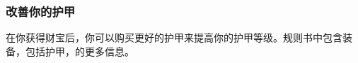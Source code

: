\documentclass[letterpaper,twocolumn,openany,nodeprecatedcode]{dndbook}
\begin{document}
\subsubsection{改善你的护甲}
在你获得财宝后，你可以购买更好的护甲来提高你的护甲等级。规则书中包含装备，包括护甲，的更多信息。









\end{document}

